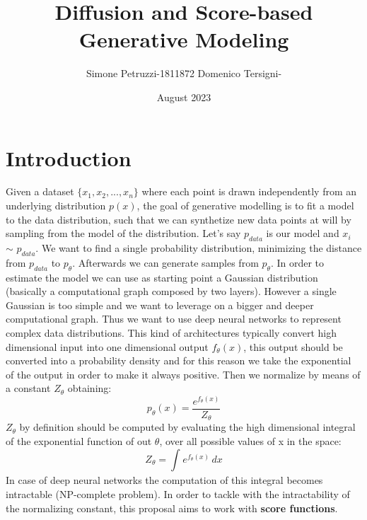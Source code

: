 \documentclass{article}
\title{Diffusion and Score-based Generative Modeling}
\author{Simone Petruzzi-1811872 Domenico Tersigni-}
\date{August 2023}
\begin{document}
   \maketitle
   \section{Introduction}
	Given a dataset $\{ x_1,x_2,...,x_n \}$ where each point is drawn independently from an underlying distribution $p(x)$, the goal of generative modelling is to fit a model to the data distribution, such that we can synthetize new data points at will by sampling from the model of the distribution.\newline
	Let's say $p_{data}$ is our model and $x_i$ $\sim$ $p_{data}$. We want to find a single probability distribution, minimizing the distance from $p_{data}$ to $p_{\theta}$. Afterwards we can generate samples from $p_{\theta}$. In order to estimate the model we can use as starting point a Gaussian distribution (basically a computational graph composed by two layers). However a single Gaussian is too simple and we want to leverage on a bigger and deeper computational graph. Thus we want to use deep neural networks to represent complex data distributions. This kind of architectures typically convert high dimensional input into one dimensional output $f_{\theta}(x)$, this output should be converted into a probability density and for this reason we take the exponential of the output in order to make it always positive. Then we normalize by means of a constant $Z_{\theta}$ obtaining:\newline
	\begin{equation}
	p_{\theta}(x) = \frac{e^{f_{\theta}(x)}}{Z_{\theta}}
	\end{equation}
	$Z_{\theta}$ by definition should be computed by evaluating the high dimensional integral of the exponential function of out $\theta$, over all possible values of x in the space:
	\begin{equation}
	Z_{\theta}= \int_{}^{} e^{f_{\theta}(x)} \,dx 
	\end{equation}
	In case of deep neural networks the computation of this integral becomes intractable (NP-complete problem). In order to tackle with the intractability of the normalizing constant, this proposal aims to work with \textbf{score functions}.
	\newpage
\end{document}
